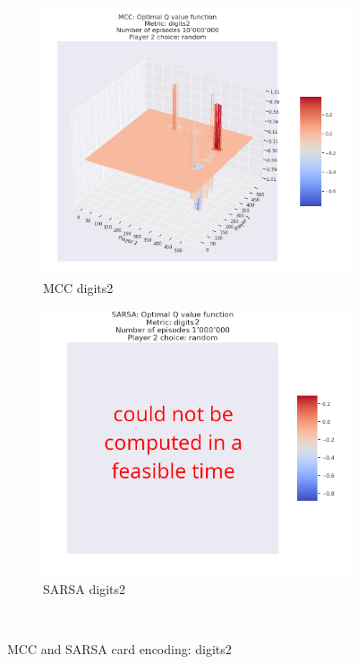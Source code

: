 \begin{figure}[t!]
    \begin{subfigure}{0.5\textwidth}
        \includegraphics[width=1\linewidth]{Figures/mcc_digits2_10000000_random} 
        \caption[MCC digits2]{MCC digits2}
        \label{fig:mcc digits1}
    \end{subfigure}
    \begin{subfigure}{0.5\textwidth}
        \includegraphics[width=1\linewidth]{Figures/SARSA_digits2_1000000_random}
        \caption[SARSA digits2]{SARSA digits2}
        \label{fig:sarsa digits2}
    \end{subfigure} \\
    \caption{MCC and SARSA card encoding: digits2}
\label{fig:MCC and SARSA card encoding: digits2}
\end{figure}
